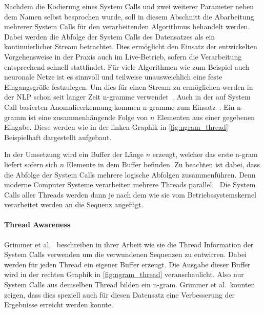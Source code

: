             Nachdem die Kodierung eines System Calls und zwei weiterer Parameter neben dem Namen selbst besprochen wurde, soll in diesem Abschnitt die Abarbeitung mehrerer System Calls für den verarbeitenden Algorithmus behandelt werden.
            Dabei werden die Abfolge der System Calls des Datensatzes als ein kontinuierlicher Stream betrachtet.
            Dies ermöglicht den Einsatz der entwickelten Vorgehensweise in der Praxis auch im Live-Betrieb, sofern die Verarbeitung entsprechend schnell stattfindet.
            Für viele Algorithmen wie zum Beispiel auch neuronale Netze ist es sinnvoll und teilweise unausweichlich eine feste Eingangsgröße festzulegen.
            Um dies für einen Stream zu ermöglichen werden in der \ac{NLP} schon seit langer Zeit n-gramme verwendet~\cite{NGRAMSUEN1979}.
            Auch in der auf System Call basierten Anomalieerkennung kommen n-gramme zum Einsatz~\cite{STIDE_Alternatives, SYSCALL_GRAPHS, IDSTHREADGRIMMER2021}.
            Ein n-gramm ist eine zusammenhängende Folge von $n$ Elementen aus einer gegebenen Eingabe.
            Diese werden wie in der linken Graphik in \autoref{fig:ngram_thread} Beispielhaft dargestellt aufgebaut.

            In der Umsetzung wird ein Buffer der Länge $n$ erzeugt, welcher das erste n-gram liefert sofern sich $n$ Elemente in dem Buffer befinden.
            Zu beachten ist dabei, dass die Abfolge der System Calls mehrere logische Abfolgen zusammenführen.
            Denn moderne Computer Systeme verarbeiten mehrere Threads parallel.~\cite{SYSCALL_SILBERSCHATZ}
            Die System Calls aller Threads werden dann je nach dem wie sie vom Betriebssystemskernel verarbeitet werden an die Sequenz angefügt.
            
            \paragraph{Thread Awareness}
                Grimmer et al.~\cite{IDSTHREADGRIMMER2021} beschreiben in ihrer Arbeit wie sie die Thread Information der System Calls verwenden um die verwundenen Sequenzen zu entwirren.
                Dabei werden für jeden Thread ein eigener Buffer erzeugt. Die Ausgabe dieser Buffer wird in der rechten Graphik in \autoref{fig:ngram_thread} veranschaulicht. 
                Also nur System Calls aus demselben Thread bilden ein n-gram.
                Grimmer et al.\ konnten zeigen, dass dies speziell auch für diesen Datensatz eine Verbesserung der Ergebnisse erreicht werden konnte.

